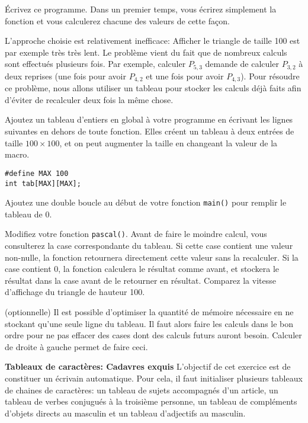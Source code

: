 \documentclass[10pt]{article}\usepackage[correction]{esial}
\begin{document}
\Question Écrivez ce programme. Dans un premier temps, vous écrirez simplement
la fonction  et vous calculerez
chacune des valeurs de cette façon.

L'approche choisie est relativement inefficace: Afficher le triangle de taille
100 est par exemple très très lent. Le problème vient du fait que de nombreux
calculs sont effectués plusieurs fois. Par exemple, calculer $P_{5,3}$ demande
de calculer $P_{3,2}$ à deux reprises (une fois pour avoir $P_{4,2}$ et une
fois pour avoir $P_{4,3}$). Pour résoudre ce problème, nous allons utiliser un
tableau pour stocker les calculs déjà faits afin d'éviter de recalculer deux
fois la même chose.

\Question Ajoutez un tableau d'entiers en global à votre programme en écrivant
les lignes suivantes en dehors de toute fonction. Elles créent un tableau à
deux entrées de taille $100\times100$, et on peut augmenter la taille en
changeant la valeur de la macro.

\begin{Verbatim}
#define MAX 100
int tab[MAX][MAX];
\end{Verbatim}

Ajoutez une double boucle au début de votre fonction \texttt{main()} pour
remplir le tableau de 0.

\Question Modifiez votre fonction \texttt{pascal()}. Avant de faire le moindre
calcul, vous consulterez la case correspondante du tableau. Si cette case
contient une valeur non-nulle, la fonction retournera directement cette valeur
sans la recalculer. Si la case contient 0, la fonction calculera le résultat
comme avant, et stockera le résultat dans la case avant de le retourner en
résultat. Comparez la vitesse d'affichage du triangle de hauteur 100.

\Question (optionnelle) Il est possible d'optimiser la quantité de mémoire
nécessaire en ne stockant qu'une seule ligne du tableau. Il faut alors faire
les calculs dans le bon ordre pour ne pas effacer des cases dont des calculs
futurs auront besoin. Calculer de droite à gauche permet de faire ceci.

\bigskip\Exercice\textbf{Tableaux de caractères: Cadavres exquis}
L'objectif de cet exercice est de constituer un écrivain automatique. Pour
cela, il faut initialiser plusieurs tableaux de chaines de caractères: un
tableau de sujets accompagnés d'un article, un tableau de verbes conjugués à la
troisième personne, un tableau de compléments d'objets directs au masculin et
un tableau d'adjectifs au masculin.
\end{document}
